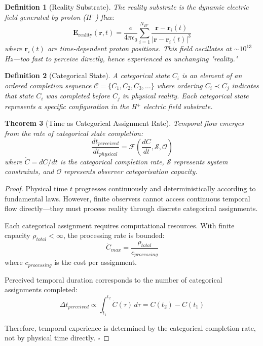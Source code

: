 \documentclass[11pt,a4paper]{article}
\newtheorem{theorem}{Theorem}
\newtheorem{definition}[theorem]{Definition}
\begin{document}
\begin{definition}[Reality Substrate]
The reality substrate is the dynamic electric field generated by proton (H$^+$) flux:
\begin{equation}
\mathbf{E}_{\text{reality}}(\mathbf{r}, t) = \frac{e}{4\pi\epsilon_0} \sum_{i=1}^{N_{H^+}} \frac{\mathbf{r} - \mathbf{r}_i(t)}{|\mathbf{r} - \mathbf{r}_i(t)|^3}
\end{equation}
where $\mathbf{r}_i(t)$ are time-dependent proton positions. This field oscillates at $\sim 10^{13}$ Hz—too fast to perceive directly, hence experienced as unchanging "reality."
\end{definition}

\begin{definition}[Categorical State]
A categorical state $C_i$ is an element of an ordered completion sequence $\mathcal{C} = \{C_1, C_2, C_3, \ldots\}$ where ordering $C_i \prec C_j$ indicates that state $C_i$ was completed before $C_j$ in physical reality. Each categorical state represents a specific configuration in the H$^+$ electric field substrate.
\end{definition}

\begin{theorem}[Time as Categorical Assignment Rate]
Temporal flow emerges from the rate of categorical state completion:
\begin{equation}
\frac{dt_{perceived}}{dt_{physical}} = \mathcal{F}\left(\frac{dC}{dt}, \mathcal{S}, \mathcal{O}\right)
\label{eq:temporal_construction}
\end{equation}
where $\dot{C} = dC/dt$ is the categorical completion rate, $\mathcal{S}$ represents system constraints, and $\mathcal{O}$ represents observer categorisation capacity.
\end{theorem}

\begin{proof}
Physical time $t$ progresses continuously and deterministically according to fundamental laws. However, finite observers cannot access continuous temporal flow directly—they must process reality through discrete categorical assignments.

Each categorical assignment requires computational resources. With finite capacity $\rho_{total} < \infty$, the processing rate is bounded:
\begin{equation}
\dot{C}_{max} = \frac{\rho_{total}}{c_{processing}}
\end{equation}
where $c_{processing}$ is the cost per assignment.

Perceived temporal duration corresponds to the number of categorical assignments completed:
\begin{equation}
\Delta t_{perceived} \propto \int_{t_1}^{t_2} \dot{C}(\tau) \, d\tau = C(t_2) - C(t_1)
\end{equation}

Therefore, temporal experience is determined by the categorical completion rate, not by physical time directly. $\square$
\end{proof}
\end{document}
